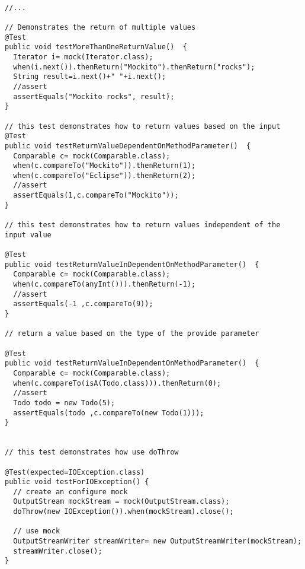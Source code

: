 \documentclass{article}
\begin{document}
\begin{lstlisting}

//...

// Demonstrates the return of multiple values
@Test
public void testMoreThanOneReturnValue()  {
  Iterator i= mock(Iterator.class);
  when(i.next()).thenReturn("Mockito").thenReturn("rocks");
  String result=i.next()+" "+i.next();
  //assert
  assertEquals("Mockito rocks", result);
}

// this test demonstrates how to return values based on the input
@Test
public void testReturnValueDependentOnMethodParameter()  {
  Comparable c= mock(Comparable.class);
  when(c.compareTo("Mockito")).thenReturn(1);
  when(c.compareTo("Eclipse")).thenReturn(2);
  //assert
  assertEquals(1,c.compareTo("Mockito"));
}

// this test demonstrates how to return values independent of the input value

@Test
public void testReturnValueInDependentOnMethodParameter()  {
  Comparable c= mock(Comparable.class);
  when(c.compareTo(anyInt())).thenReturn(-1);
  //assert
  assertEquals(-1 ,c.compareTo(9));
}

// return a value based on the type of the provide parameter

@Test
public void testReturnValueInDependentOnMethodParameter()  {
  Comparable c= mock(Comparable.class);
  when(c.compareTo(isA(Todo.class))).thenReturn(0);
  //assert
  Todo todo = new Todo(5);
  assertEquals(todo ,c.compareTo(new Todo(1)));
} 


// this test demonstrates how use doThrow

@Test(expected=IOException.class)
public void testForIOException() {
  // create an configure mock
  OutputStream mockStream = mock(OutputStream.class);
  doThrow(new IOException()).when(mockStream).close();
  
  // use mock
  OutputStreamWriter streamWriter= new OutputStreamWriter(mockStream);
  streamWriter.close();
} 

\end{lstlisting}
\end{document}
